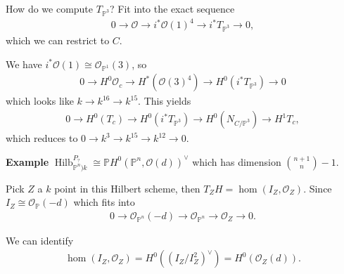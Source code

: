 How do we compute \(T_{{\mathbb{P}}^3}\)? Fit into the exact sequence
\begin{align*}
0 \to {\mathcal{O}}\to i^* {\mathcal{O}}(1)^4 \to i^* T_{{\mathbb{P}}^3} \to 0
,\end{align*}
which we can restrict to \(C\).

We have
\(i^* {\mathcal{O}}(1) \cong {\mathcal{O}}_{{\mathbb{P}}^1}(3)\), so
\begin{align*}
0 \to H^0 {\mathcal{O}}_c \to H^*({\mathcal{O}}(3)^4) \to H^0(i^* T_{{\mathbb{P}}^3}) \to 0
\end{align*}
which looks like \(k \to k^{16} \to k^{15}\). This yields
\begin{align*}
0 \to H^0(T_c) \to H^0(i^* T_{{\mathbb{P}}^3}) \to H^0(N_{C/{\mathbb{P}}^3}) \to H^1 T_c
,\end{align*}
which reduces to \(0\to k^3 \to k^{15} \to k^{12} \to 0\).

\textbf{Example}
\(\operatorname{Hilb}_{{\mathbb{P}}^n)k}^{P_?} \cong {\mathbb{P}}H^0({\mathbb{P}}^n, {\mathcal{O}}(d))^\vee\)
which has dimension \({n+1 \choose n} - 1\).

Pick \(Z\) a \(k\) point in this Hilbert scheme, then
\(T_Z H = \hom(I_Z, {\mathcal{O}}_Z)\). Since
\(I_Z \cong {\mathcal{O}}_{{\mathbb{P}}}(-d)\) which fits into
\begin{align*}
0 \to {\mathcal{O}}_{{\mathbb{P}}^n}(-d) \to {\mathcal{O}}_{{\mathbb{P}}^n} \to {\mathcal{O}}_Z \to 0
.\end{align*}

We can identify
\begin{align*}
\hom(I_Z,{\mathcal{O}}_Z) = H^0( (I_Z/I_Z^2)^\vee) = H^0({\mathcal{O}}_Z(d))
.\end{align*}

\begin{center}
\end{center}

